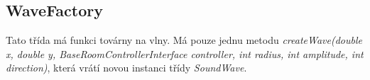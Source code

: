 \subsection{WaveFactory}
Tato třída má funkci továrny na vlny. Má pouze jednu metodu \textit{createWave(double x, double y, BaseRoomControllerInterface controller, int radius, int amplitude, int direction)}, která vrátí novou instanci třídy \textit{SoundWave}.